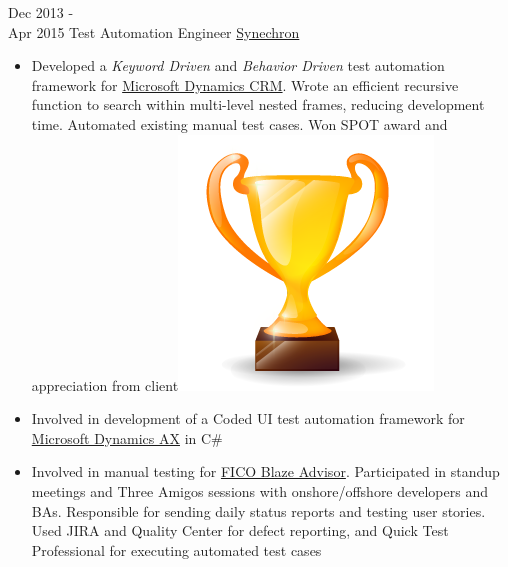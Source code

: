 \documentclass[letterpaper]{twentysecondcv} %
\begin{document}
\begin{twenty}
     \twentyitem
   		{Dec 2013 - \\ Apr 2015}
        {Test Automation Engineer}
        {\href{http://www.synechron.com/}{Synechron}}
        {}
        {
        \begin{itemize}
        \item Developed a \textit{Keyword Driven} and \textit{Behavior Driven} test automation framework for \href{https://www.microsoft.com/en-ca/dynamics/crm.aspx}{Microsoft Dynamics CRM}. Wrote an efficient recursive function to search within multi-level nested frames, reducing development time. Automated existing manual test cases. Won SPOT award and appreciation from client{\includegraphics[scale=0.05]{img/trophy.png}}
        \item Involved in development of a Coded UI test automation framework for \href{https://www.microsoft.com/en-ca/dynamics/erp-ax-overview.aspx}{Microsoft Dynamics AX} in C\#
        \item Involved in manual testing for \href{http://www.fico.com/en/products/fico-blaze-advisor-decision-rules-management-system}{FICO Blaze Advisor}. Participated in standup meetings and Three Amigos sessions with onshore/offshore developers and BAs. Responsible for sending daily status reports and testing user stories. Used JIRA and Quality Center for defect reporting, and Quick Test Professional for executing automated test cases
    \end{itemize}
    	}
        
\end{twenty}
\end{document}
